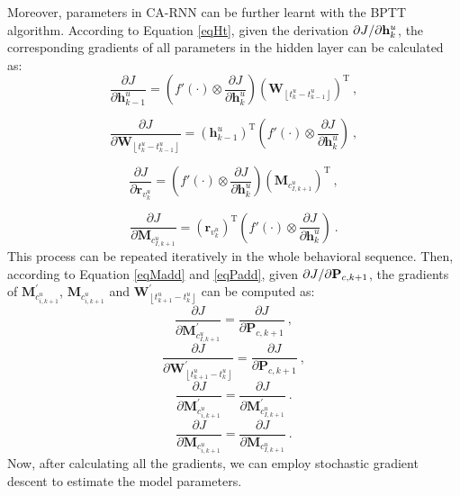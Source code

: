 \documentclass[conference]{IEEEtran}
\begin{document}
Moreover, parameters in CA-RNN can be further learnt with the BPTT algorithm. According to Equation \ref{eqHt}, given the derivation ${\partial J \mathord{\left/ \right. \kern-\nulldelimiterspace} {\partial \mathbf{h}_{k}^{u} } }$, the corresponding gradients of all parameters in the hidden layer can be calculated as: 
\begin{displaymath}
\frac{{\partial J}}{{\partial \mathbf{h}^u_{k-1} }} =  \left( {f'\left(  \cdot  \right) \otimes \frac{{\partial J}}{{\partial \mathbf{h}^u_{k} }}} \right)\left({\mathbf{W}_{\left \lfloor t_{k}^{u} - t_{k-1}^{u} \right \rfloor}}\right)^\mathrm{T} ~,
\end{displaymath}

\begin{displaymath}
\frac{{\partial J}}{{\partial {\mathbf{W}_{\left \lfloor t_{k}^{u} - t_{k-1}^{u} \right \rfloor}} }} =  \left({\mathbf{h}_{k-1}^u}\right)^\mathrm{T}\left( {f'\left(  \cdot  \right) \otimes \frac{{\partial J}}{{\partial \mathbf{h}^u_{k} }}} \right) ~,
\end{displaymath}

\begin{displaymath}
\frac{{\partial J}}{{\partial \mathbf{r}_{v_k^u} }} =  \left( {f'\left(  \cdot  \right) \otimes \frac{{\partial J}}{{\partial \mathbf{h}^u_{k} }}} \right)\left({\mathbf{M}_{c^u_{I,k+1}}}\right)^\mathrm{T} ~,
\end{displaymath}

\begin{displaymath}
\frac{{\partial J}}{{\partial {\mathbf{M}_{c^u_{I,k+1}}} }} =  \left({\mathbf{r}_{v^u_k}}\right)^\mathrm{T}\left( {f'\left(  \cdot  \right) \otimes \frac{{\partial J}}{{\partial \mathbf{h}^u_{k} }}} \right) ~.
\end{displaymath}
This process can be repeated iteratively in the whole behavioral sequence. 
Then, according to Equation \ref{eqMadd} and \ref{eqPadd}, given ${\partial J \mathord{\left/ \right. \kern-\nulldelimiterspace} {\partial \mathbf{P}_{c,k+1} } }$, the gradients of $\mathbf{M}^{'}_{c^u_{i,k+1}}$, $\mathbf{M}_{c^u_{i,k+1}}$ and $\mathbf{W}^{'}_{\left \lfloor t_{k+1}^{u} - t_{k}^{u} \right \rfloor}$ can be computed as: 
\begin{displaymath}
\frac{{\partial J}}{{\partial {\mathbf{M}^{'}_{c^u_{I,k+1}}} }} =  \frac{\partial J}{\partial \mathbf{P}_{c,k+1}} ~,
\end{displaymath}
\begin{displaymath}
\frac{{\partial J}}{{\partial {\mathbf{W}^{'}_{\left \lfloor t_{k+1}^{u} - t_{k}^{u} \right \rfloor}} }} =  \frac{\partial J}{\partial \mathbf{P}_{c,k+1}} ~,
\end{displaymath}
\begin{displaymath}
\frac{{\partial J}}{{\partial {\mathbf{M}^{'}_{c^u_{i,k+1}}} }} =  \frac{\partial J}{\partial \mathbf{M}^{'}_{c^u_{I,k+1}}} ~.
\end{displaymath}
\begin{displaymath}
\frac{{\partial J}}{{\partial {\mathbf{M}_{c^u_{i,k+1}}} }} =  \frac{\partial J}{\partial \mathbf{M}_{c^u_{I,k+1}}} ~.
\end{displaymath}
Now, after calculating all the gradients, we can employ stochastic gradient descent to estimate the model parameters. 
\end{document}
